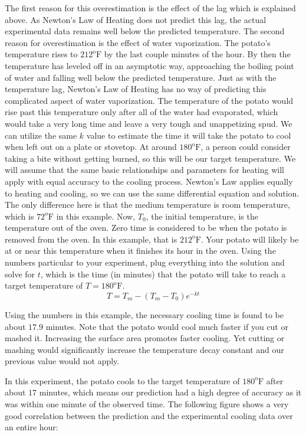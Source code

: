 \documentclass{ximera}
\begin{document}
The first reason for this overestimation is the effect of the lag which is explained above.  As Newton's Law of Heating does not predict this lag, the actual experimental data remains well below the predicted temperature.  The second reason for overestimation is the effect of water vaporization.  The potato's temperature rises to $212^{\text{o}}\text{F}$ by the last couple minutes of the hour.  By then the temperature has leveled off in an asymptotic way, approaching the boiling point of water and falling well below the predicted temperature.  Just as with the temperature lag, Newton's Law of Heating has no way of predicting this complicated aspect of water vaporization.  The temperature of the potato would rise past this temperature only after all of the water had evaporated, which would take a very long time and leave a very tough and unappetizing spud.
We can utilize the same $k$ value to estimate the time it will take the potato to cool when left out on a plate or stovetop.  At around $180^{\text{o}}\text{F}$, a person could consider taking a bite without getting burned, so this will be our target temperature.  We will assume that the same basic relationships and parameters for heating will apply with equal accuracy to the cooling process.  Newton's Law applies equally to heating and cooling, so we can use the same differential equation and solution.  The only difference here is that the medium temperature  is room temperature, which is $72^{\text{o}}\text{F}$ in this example.  Now, $T_0$, the initial temperature, is the temperature out of the oven.  Zero time is considered to be when the potato is removed from the oven.  In this example, that is $212^{\text{o}}\text{F}$.  Your potato will likely be at or near this temperature when it finishes its hour in the oven.  Using the numbers particular to your experiment, plug everything into the solution and solve for $t$, which is the time (in minutes) that the potato will take to reach a target temperature of $T=180^{\text{o}}\text{F}$.
\[
T = T_m-(T_m-T_0)e^{-kt}
\]
 
Using the numbers in this example, the necessary cooling time is found to be about $17.9$ minutes.  Note that the potato would cool much faster if you cut or mashed it.  Increasing the surface area promotes faster cooling.  Yet cutting or mashing would significantly increase the temperature decay constant and our previous value would not apply.
 
In this experiment, the potato cools to the target temperature of $180^{\text{o}}\text{F}$ after about $17$ minutes, which means our prediction had a high degree of accuracy as it was within one minute of the observed time.  The following figure shows a very good correlation between the prediction and the experimental cooling data over an entire hour:
 
\end{document}
